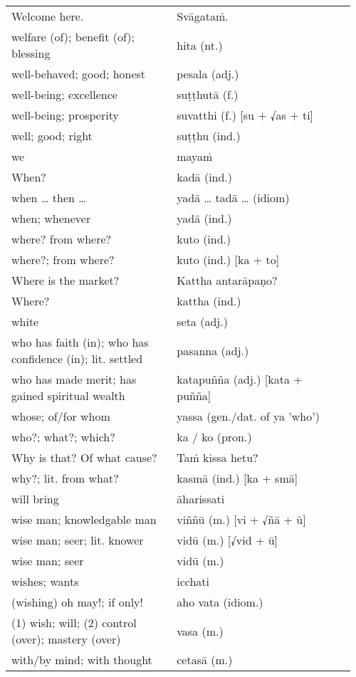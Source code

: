 \documentclass[a5paper]{memoir}
\begin{document}
\begin{longtable}{L{0.48\linewidth} L{0.48\linewidth} H}
Welcome here. & Svāgataṁ. & \\[0pt]
welfare (of); benefit (of); blessing & hita (nt.) & \\[0pt]
well-behaved; good; honest & pesala (adj.) & \\[0pt]
well-being; excellence & suṭṭhutā (f.) & \\[0pt]
well-being; prosperity & suvatthi (f.) [su + √as + ti] & \\[0pt]
well; good; right & suṭṭhu (ind.) & \\[0pt]
we & mayaṁ & \\[0pt]
When? & kadā (ind.) & \\[0pt]
when \ldots{} then \ldots{} & yadā \ldots{} tadā \ldots{} (idiom) & \\[0pt]
when; whenever & yadā (ind.) & \\[0pt]
where? from where? & kuto (ind.) & \\[0pt]
where?; from where? & kuto (ind.) [ka + to] & \\[0pt]
Where is the market? & Kattha antarāpaṇo? & \\[0pt]
Where? & kattha (ind.) & \\[0pt]
white & seta (adj.) & \\[0pt]
who has faith (in); who has confidence (in); lit. settled & pasanna (adj.) & \\[0pt]
who has made merit; has gained spiritual wealth & katapuñña (adj.) [kata + puñña] & \\[0pt]
whose; of/for whom & yassa (gen./dat. of ya 'who') & \\[0pt]
who?; what?; which? & ka / ko (pron.) & \\[0pt]
Why is that? Of what cause? & Taṁ kissa hetu? & \\[0pt]
why?; lit. from what? & kasmā (ind.) [ka + smā] & \\[0pt]
will bring & āharissati & \\[0pt]
wise man; knowledgable man & viññū (m.) [vi + √ñā + ū] & \\[0pt]
wise man; seer; lit. knower & vidū (m.) [√vid + ū] & \\[0pt]
wise man; seer & vidū (m.) & \\[0pt]
wishes; wants & icchati & \\[0pt]
(wishing) oh may!; if only! & aho vata (idiom.) & \\[0pt]
(1) wish; will; (2) control (over); mastery (over) & vasa (m.) & \\[0pt]
with/by mind; with thought & cetasā (m.) & \\[0pt]

\end{longtable}
\end{document}
